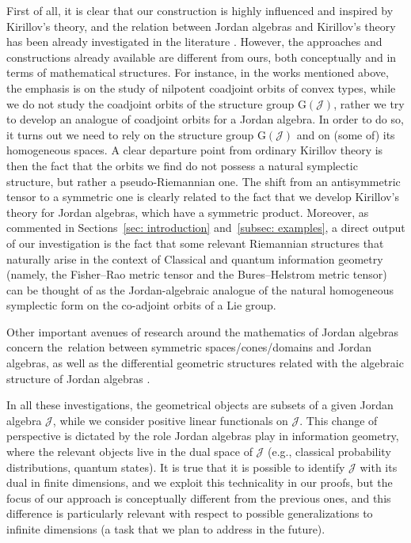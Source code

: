 \documentclass[pdftex]{sigma}
\numberwithin{equation}{section}
\newcommand{\Jcal}{\mathcal{J}}
\newcommand{\G}{\mathrm{G}}
\begin{document}
First of all, it is clear that our construction is highly influenced and inspired by Kirillov's theory, and the relation between Jordan algebras and Kirillov's theory has been already investigated in the literature \cite{H-N-O-1995,H-N-O-1996,H-N-O-1996-2}.
However, the approaches and constructions already available are different from ours, both conceptually and in terms of mathematical structures.
For instance, in the works mentioned above, the emphasis is on the study of nilpotent coadjoint orbits of convex types, while we do not study the coadjoint orbits of the structure group $\G(\Jcal)$, rather we try to develop an analogue of coadjoint orbits for a Jordan algebra.
In order to do so, it turns out we need to rely on the structure group $\G(\Jcal)$ and on (some of) its homogeneous spaces.
A clear departure point from ordinary Kirillov theory is then the fact that the orbits we find do not possess a natural symplectic structure, but rather a pseudo-Riemannian one.
The shift from an antisymmetric tensor to a symmetric one is clearly related to the fact that we develop Kirillov's theory for Jordan algebras, which have a symmetric product.
Moreover, as commented in Sections~\ref{sec: introduction} and~\ref{subsec: examples}, a direct output of our investigation is the fact that some relevant Riemannian structures that naturally arise in the context of Classical and quantum information geometry (namely, the Fisher--Rao metric tensor and the Bures--Helstrom metric tensor) can be thought of as the Jordan-algebraic analogue of the natural homogeneous symplectic form on the co-adjoint orbits of a Lie group.

Other important avenues of research around the mathematics of Jordan algebras concern the~relation between symmetric spaces/cones/domains and Jordan algebras, as well as the differential geometric structures related with the algebraic structure of Jordan algebras \cite{Bertram-2000,B-N-2005,Chu-2012,F-K-1994,Koecher-1999,Upmeier-1985}.


In all these investigations, the geometrical objects are subsets of a given Jordan algebra $\Jcal$, while we consider positive linear functionals on $\Jcal$.
This change of perspective is dictated by the role Jordan algebras play in information geometry, where the relevant objects live in the dual space of $\Jcal$ (e.g., classical probability distributions, quantum states).
It is true that it is possible to identify $\Jcal$ with its dual in finite dimensions, and we exploit this technicality in our proofs, but the focus of our approach is conceptually different from the previous ones, and this difference is particularly relevant with respect to possible generalizations to infinite dimensions (a task that we plan to address in the future).
\end{document}
